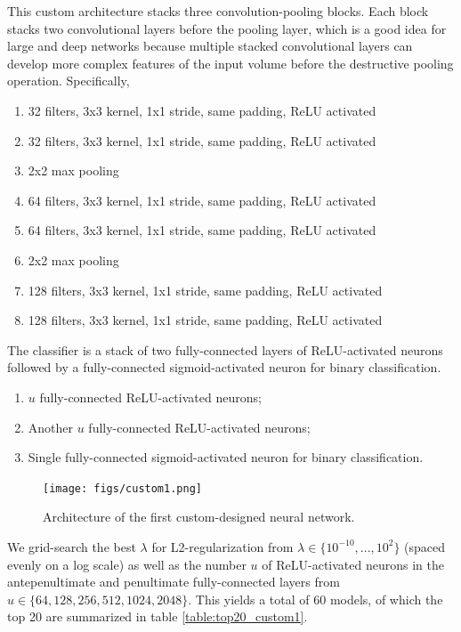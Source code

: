 This custom architecture stacks three convolution-pooling blocks. Each block stacks two convolutional layers before the pooling layer, which is a good idea for large and deep networks because multiple stacked convolutional layers can develop more complex features of the input volume before the destructive pooling operation. Specifically,

\begin{enumerate}
    \item 32 filters, 3x3 kernel, 1x1 stride, same padding, ReLU activated
    \item 32 filters, 3x3 kernel, 1x1 stride, same padding, ReLU activated
    \item 2x2 max pooling
    \item 64 filters, 3x3 kernel, 1x1 stride, same padding, ReLU activated
    \item 64 filters, 3x3 kernel, 1x1 stride, same padding, ReLU activated
    \item 2x2 max pooling
    \item 128 filters, 3x3 kernel, 1x1 stride, same padding, ReLU activated
    \item 128 filters, 3x3 kernel, 1x1 stride, same padding, ReLU activated
\end{enumerate}

The classifier is a stack of two fully-connected layers of ReLU-activated neurons followed by a fully-connected sigmoid-activated neuron for binary classification.

\begin{enumerate}
    \item $u$ fully-connected ReLU-activated neurons;
    \item Another $u$ fully-connected ReLU-activated neurons;
    \item Single fully-connected sigmoid-activated neuron for binary classification.
\end{enumerate}

\begin{figure}[ht]
    \centering
    \texttt{[image: figs/custom1.png]}
    \caption{Architecture of the first custom-designed neural network.}
    \label{fig:custom1}
\end{figure}

We grid-search the best $\lambda$ for L2-regularization from $\lambda \in \{10^{-10}, ..., 10^{2}\}$ (spaced evenly on a log scale) as well as the number $u$ of ReLU-activated neurons in the antepenultimate and penultimate fully-connected layers from $u \in \{ 64, 128, 256, 512, 1024, 2048 \}$. This yields a total of $60$ models, of which the top 20 are summarized in table \ref{table:top20_custom1}.

